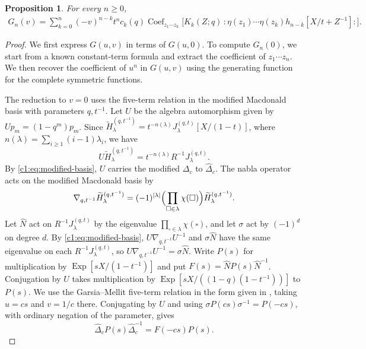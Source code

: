 \documentclass[12pt,reqno,a4paper]{amsart}
\numberwithin{equation}{section}
\numberwithin{figure}{section}
\theoremstyle{plain}
\newtheorem{proposition}[theorem]{Proposition}
\theoremstyle{definition}
\DeclareMathOperator{\Coef}{Coef}
\begin{document}
\begin{samepage}
\begin{proposition}\label{c1:prop:full-modes}
For every $n\geq0$,
\begin{equation}\label{c1:eq:full-modes}
 \begin{aligned}
 G_n(v)
 =\sum_{k=0}^n(-v)^{n-k}t^nc_k(q)
 \Coef_{z_1\cdots z_k}\bigl[K_k(Z;q)\,
 :\eta(z_1)\cdots\eta(z_k)
           h_{n-k}[X/t+Z^{-1}]:\bigr].
 \end{aligned}
\end{equation}
\end{proposition}
\end{samepage}

\begin{proof}
We first express $G(u,v)$ in terms of $G(u,0)$.  To compute $G_n(0)$,
we start from a known constant-term formula and extract the
coefficient of $z_1\cdots z_n$.  We then recover the coefficient of
$u^n$ in $G(u,v)$ using the generating function for the complete
symmetric functions.

The reduction to $v=0$ uses the five-term relation in the modified
Macdonald basis with parameters $q,t^{-1}$.  Let $U$ be the algebra
automorphism given by $Up_m=(1-q^m)p_m$.  Since
$\widetilde H_\lambda^{(q,t^{-1})}
 =t^{-n(\lambda)}J_\lambda^{(q,t)}[X/(1-t)]$, where
$n(\lambda)=\sum_{i\geq1}(i-1)\lambda_i$, we have
\begin{equation}\label{c1:eq:modified-basis}
 U\widetilde H_\lambda^{(q,t^{-1})}
       =t^{-n(\lambda)}R^{-1}J_\lambda^{(q,t)}.
\end{equation}
By \eqref{c1:eq:modified-basis}, $U$ carries the modified $\Delta_c$ to $\widehat\Delta_c$.
The nabla operator acts on the modified Macdonald basis by
\[
 \nabla_{q,t^{-1}}\widetilde H_\lambda^{(q,t^{-1})}
 =(-1)^{|\lambda|}\Bigl(\prod_{\square\in\lambda}\chi(\square)\Bigr)
     \widetilde H_\lambda^{(q,t^{-1})}.
\]
Let $\widehat N$ act on $R^{-1}J_\lambda^{(q,t)}$ by the eigenvalue
$\prod_{\square\in\lambda}\chi(\square)$, and let $\sigma$ act by
$(-1)^d$ on degree $d$.  By \eqref{c1:eq:modified-basis},
$U\nabla_{q,t^{-1}}U^{-1}$ and $\sigma\widehat N$ have the same eigenvalue
on each $R^{-1}J_\lambda^{(q,t)}$, so $U\nabla_{q,t^{-1}}U^{-1}=\sigma\widehat N$.
Write $P(s)$ for multiplication by $\operatorname{Exp}[sX/(1-t^{-1})]$ and
put $F(s)=\widehat N P(s)\widehat N^{-1}$.  Conjugation by $U$
takes multiplication by $\operatorname{Exp}[sX/((1-q)(1-t^{-1}))]$ to $P(s)$.
We use the Garsia--Mellit five-term relation \cite[Theorem~1.1]{GM19}
in the form given in \cite[equation~(11)]{BD26}, taking $u=cs$ and $v=1/c$ there.
Conjugating by $U$ and using
$\sigma P(cs)\sigma^{-1}=P(-cs)$, with ordinary negation of the
parameter, gives
\begin{equation}\label{c1:eq:five-term}
 \widehat\Delta_cP(s)\widehat\Delta_c^{-1}=F(-cs)P(s).
\end{equation}


\end{proof}
\end{document}
